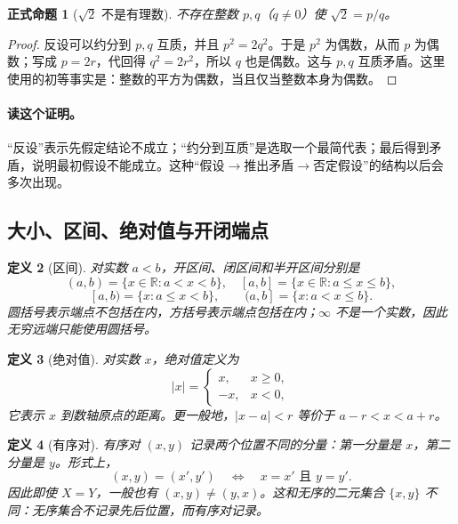 \documentclass[UTF8,fontset=none,a4paper,11pt]{ctexart}
\theoremstyle{foundation-definition}
\newtheorem{definition}{定义}[section]
\theoremstyle{foundation-theorem}
\theoremstyle{foundation-proposition}
\newtheorem{proposition}[definition]{正式命题}
\theoremstyle{foundation-example}
\theoremstyle{foundation-remark}
\theoremstyle{foundation-theorem}
\begin{document}
\begin{proposition}[\(\sqrt2\) 不是有理数]\label{prop:sqrt-two-irrational}
不存在整数 \(p,q\)（\(q\ne0\)）使 \(\sqrt2=p/q\)。
\end{proposition}

\begin{proof}
反设可以约分到 \(p,q\) 互质，并且 \(p^2=2q^2\)。于是 \(p^2\) 为偶数，从而 \(p\) 为偶数；写成 \(p=2r\)，代回得 \(q^2=2r^2\)，所以 \(q\) 也是偶数。这与 \(p,q\) 互质矛盾。这里使用的初等事实是：整数的平方为偶数，当且仅当整数本身为偶数。
\end{proof}

\paragraph{读这个证明。}
“反设”表示先假定结论不成立；“约分到互质”是选取一个最简代表；最后得到矛盾，说明最初假设不能成立。这种“假设\(\to\)推出矛盾\(\to\)否定假设”的结构以后会多次出现。

\subsection{大小、区间、绝对值与开闭端点}

\begin{definition}[区间]\label{def:interval}
对实数 \(a<b\)，开区间、闭区间和半开区间分别是
\[
(a,b)=\{x\in\mathbb R:a<x<b\},
\quad
[a,b]=\{x\in\mathbb R:a\le x\le b\},
\]
\[
[a,b)=\{x:a\le x<b\},
\qquad
(a,b]=\{x:a<x\le b\}.
\]
圆括号表示端点不包括在内，方括号表示端点包括在内；\(\infty\) 不是一个实数，因此无穷远端只能使用圆括号。
\end{definition}

\begin{definition}[绝对值]\label{def:absolute-value}
对实数 \(x\)，绝对值定义为
\[
|x|=\begin{cases}x,&x\ge0,\\-x,&x<0,\end{cases}
\]
它表示 \(x\) 到数轴原点的距离。更一般地，\(|x-a|<r\) 等价于 \(a-r<x<a+r\)。
\end{definition}

\begin{definition}[有序对]\label{def:ordered-pair}
有序对 \((x,y)\) 记录两个位置不同的分量：第一分量是 \(x\)，第二分量是 \(y\)。形式上，
\[
(x,y)=(x',y')\quad\Longleftrightarrow\quad x=x'\text{ 且 }y=y'.
\]
因此即使 \(X=Y\)，一般也有 \((x,y)\ne(y,x)\)。这和无序的二元集合
\(\{x,y\}\) 不同：无序集合不记录先后位置，而有序对记录。
\end{definition}
\end{document}
